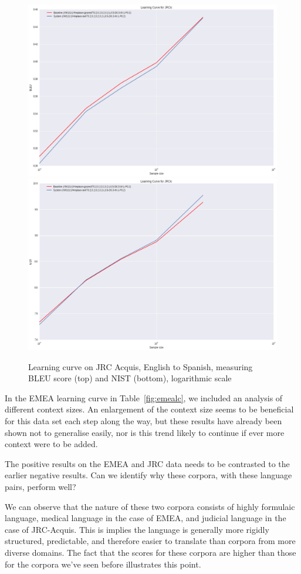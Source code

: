 \documentclass[smallextended]{svjour3}       %
\theoremstyle{break}
\begin{document}
\begin{figure}
\includegraphics[width=120.00mm]{jrclcbleu.png}
\includegraphics[width=120.00mm]{jrclcnist.png}
\caption{Learning curve on JRC Acquis, English to Spanish, measuring BLEU score (top) and NIST (bottom), logarithmic scale}
\label{fig:jrclc}
\end{figure}


In the EMEA learning curve in Table~\ref{fig:emealc}, we included an analysis
of different context sizes.  An enlargement of the context size seems to be
beneficial for this data set each step along the way, but these results have
already been shown not to generalise easily, nor is this trend likely to
continue if ever more context were to be added.

The positive results on the EMEA and JRC data needs to be contrasted to the
earlier negative results. Can we identify why these corpora, with these
language pairs, perform well?

We can observe that the nature of these two corpora consists of highly
formulaic language, medical language in the case of EMEA, and judicial language
in the case of JRC-Acquis.  This is implies the language is generally more
rigidly structured, predictable, and therefore easier to translate than corpora
from more diverse domains. The fact that the scores for these corpora are
higher than those for the corpora we've seen before illustrates this point.
\end{document}
